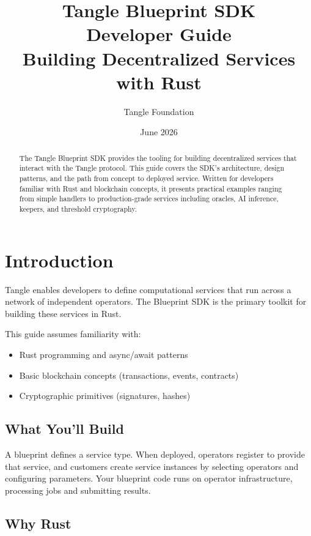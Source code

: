 \documentclass[11pt,a4paper]{article}
\title{\textbf{Tangle Blueprint SDK}\\[0.5em]\large Developer Guide\\[1em]\normalsize Building Decentralized Services with Rust}
\author{Tangle Foundation}
\date{June 2026}
\begin{document}
\maketitle

\begin{abstract}
The Tangle Blueprint SDK provides the tooling for building decentralized services that interact with the Tangle protocol. This guide covers the SDK's architecture, design patterns, and the path from concept to deployed service. Written for developers familiar with Rust and blockchain concepts, it presents practical examples ranging from simple handlers to production-grade services including oracles, AI inference, keepers, and threshold cryptography.
\end{abstract}

\tableofcontents
\newpage

\section{Introduction}

Tangle enables developers to define computational services that run across a network of independent operators. The Blueprint SDK is the primary toolkit for building these services in Rust.

This guide assumes familiarity with:
\begin{itemize}[noitemsep]
    \item Rust programming and async/await patterns
    \item Basic blockchain concepts (transactions, events, contracts)
    \item Cryptographic primitives (signatures, hashes)
\end{itemize}

\subsection{What You'll Build}

A blueprint defines a service type. When deployed, operators register to provide that service, and customers create service instances by selecting operators and configuring parameters. Your blueprint code runs on operator infrastructure, processing jobs and submitting results.

\subsection{Why Rust}
\end{document}
